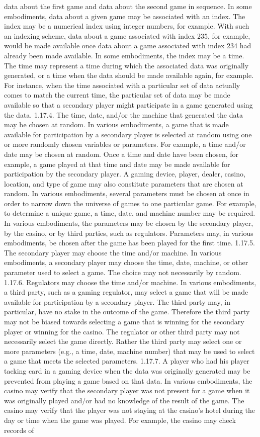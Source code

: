 \documentclass[11pt,a4paper]{article}
\begin{document}
data about the first game and data about the second game in sequence. In some embodiments, data about a given game may be associated with an index. The index may be a numerical index using integer numbers, for example. With such an indexing scheme, data about a game associated with index 235, for example, would be made available once data about a game associated with index 234 had already been made available. In some embodiments, the index may be a time. The time may represent a time during which the associated data was originally generated, or a time when the data should be made available again, for example. For instance, when the time associated with a particular set of data actually comes to match the current time, the particular set of data may be made available so that a secondary player might participate in a game generated using the data. 1.17.4. The time, date, and/or the machine that generated the data may be chosen at random. In various embodiments, a game that is made available for participation by a secondary player is selected at random using one or more randomly chosen variables or parameters. For example, a time and/or date may be chosen at random. Once a time and date have been chosen, for example, a game played at that time and date may be made available for participation by the secondary player. A gaming device, player, dealer, casino, location, and type of game may also constitute parameters that are chosen at random. In various embodiments, several parameters must be chosen at once in order to narrow down the universe of games to one particular game. For example, to determine a unique game, a time, date, and machine number may be required. In various embodiments, the parameters may be chosen by the secondary player, by the casino, or by third parties, such as regulators. Parameters may, in various embodiments, be chosen after the game has been played for the first time. 1.17.5. The secondary player may choose the time and/or machine. In various embodiments, a secondary player may choose the time, date, machine, or other parameter used to select a game. The choice may not necessarily by random. 1.17.6. Regulators may choose the time and/or machine. In various embodiments, a third party, such as a gaming regulator, may select a game that will be made available for participation by a secondary player. The third party may, in particular, have no stake in the outcome of the game. Therefore the third party may not be biased towards selecting a game that is winning for the secondary player or winning for the casino. The regulator or other third party may not necessarily select the game directly. Rather the third party may select one or more parameters (e.g., a time, date, machine number) that may be used to select a game that meets the selected parameters. 1.17.7. A player who had his player tacking card in a gaming device when the data was originally generated may be prevented from playing a game based on that data. In various embodiments, the casino may verify that the secondary player was not present for a game when it was originally played and/or had no knowledge of the result of the game. The casino may verify that the player was not staying at the casino's hotel during the day or time when the game was played. For example, the casino may check records of 
\end{document}
